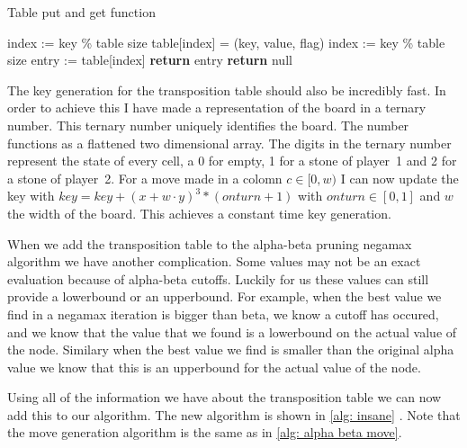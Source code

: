 \documentclass[a4paper]{article}
\begin{document}
\begin{algorithm}
	\caption{Table put and get function}
	\label{alg: table}
	\begin{algorithmic}[1]
			\State index := key \% table size
			\State table[index] = (key, value, flag)
		\EndFunction
			\State index := key \% table size
			\State entry := table[index]
					\State \textbf{return} entry
				\EndIf
			\EndIf
			\State \textbf{return} null
		\EndFunction
	\end{algorithmic}
\end{algorithm}

The key generation for the transposition table should also be incredibly fast.
In order to achieve this I have made a representation of the board in a ternary
number. This ternary number uniquely identifies the board. The number functions
as a flattened two dimensional array. The digits in the ternary number
represent the state of every cell, a 0 for empty, 1 for a stone of player~1 and
2 for a stone of player~2. For a move made in a colomn $c \in [0, w)$ I can now
update the key with $key = key + (x + w \cdot y)^3 * (onturn + 1)$ with $onturn
\in [0,1]$ and $w$ the width of the board. This achieves a constant time key
generation.

When we add the transposition table to the alpha-beta pruning negamax algorithm
we have another complication. Some values may not be an exact evaluation
because of alpha-beta cutoffs. Luckily for us these values can still provide a
lowerbound or an upperbound. For example, when the best value we find in a
negamax iteration is bigger than beta, we know a cutoff has occured, and we
know that the value that we found is a lowerbound on the actual value of the
node. Similary when the best value we find is smaller than the original alpha
value we know that this is an upperbound for the actual value of the node.

Using all of the information we have about the transposition table we can now
add this to our algorithm. The new algorithm is shown in \ref{alg: insane}
\cite{wiki:negamax}. Note that the move generation algorithm is the same as in
\ref{alg: alpha beta move}.
\end{document}
